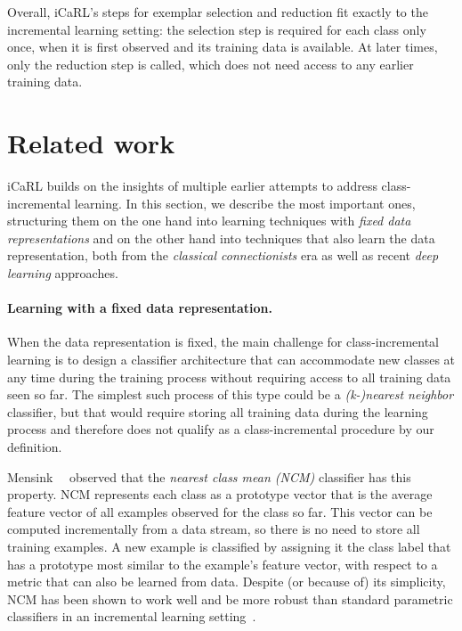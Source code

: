 \documentclass[10pt,twocolumn,letterpaper]{article}
\begin{document}
Overall, iCaRL's steps for exemplar selection and 
reduction fit exactly to the incremental learning setting: 
the selection step is required for each class only once, 
when it is first observed and its training data is available. 
At later times, only the reduction step is called, which does 
not need access to any earlier training data.




\section{Related work}\label{sec:relatedwork}
iCaRL builds on the insights of multiple earlier 
attempts to address class-incremental learning. 
In this section, we describe the most important ones, 
structuring them on the one hand into learning techniques 
with \emph{fixed data representations} and on the other
hand into techniques that also learn the data 
representation, both from the \emph{classical connectionists} 
era as well as recent \emph{deep learning} approaches. 

\paragraph{Learning with a fixed data representation.}
When the data representation is fixed, the main 
challenge for class-incremental learning is to 
design a classifier architecture that can accommodate new 
classes at any time during the training process without 
requiring access to all training data seen so far. 
The simplest such process of this type could be a 
\emph{(k-)nearest neighbor} classifier, but that would 
require storing all training data during the learning 
process and therefore does not qualify as a 
class-incremental procedure by our definition.

Mensink~\etal~\cite{Mensink2012} observed that the 
\emph{nearest class mean (NCM)} classifier has this 
property. 
NCM represents each class as a prototype vector that is the 
average feature vector of all examples observed for the 
class so far. 
This vector can be computed incrementally from a data 
stream, so there is no need to store all training examples. 
A new example is classified by assigning it the class 
label that has a prototype most similar to the example's 
feature vector, with respect to a metric that can also 
be learned from data.
Despite (or because of) its simplicity, NCM has been shown 
to work well and be more robust than standard parametric 
classifiers in an incremental 
learning setting~\cite{Mensink2012,mensink2013distance,ristin2014incremental}. 
\end{document}
